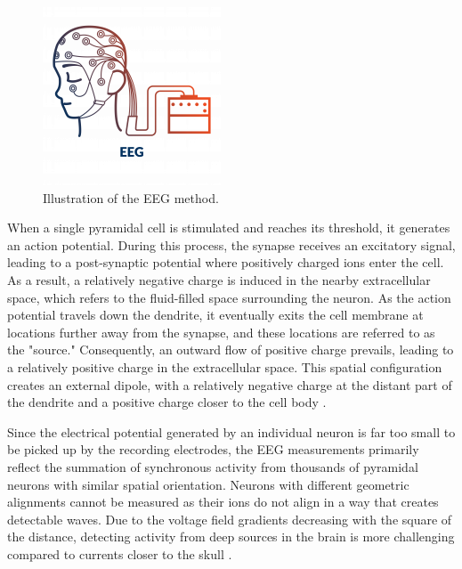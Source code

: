 \documentclass[a4paper, UKenglish, 11pt]{uiomaster}
\begin{document}
\begin{figure}[!htb]
    \centering
    \includegraphics[width=0.6\linewidth]{figures/EEG.png}
    \caption{Illustration of the EEG method.}
    \label{fig:EEG}
\end{figure}


When a single pyramidal cell is stimulated and reaches its threshold, it generates an action potential. During this process, the synapse receives an excitatory signal, leading to a post-synaptic potential where positively charged ions enter the cell. As a result, a relatively negative charge is induced in the nearby extracellular space, which refers to the fluid-filled space surrounding the neuron. As the action potential travels down the dendrite, it eventually exits the cell membrane at locations further away from the synapse, and these locations are referred to as the "source." Consequently, an outward flow of positive charge prevails, leading to a relatively positive charge in the extracellular space. This spatial configuration creates an external dipole, with a relatively negative charge at the distant part of the dendrite and a positive charge closer to the cell body \cite{bromfield2006introduction}.

Since the electrical potential generated by an individual neuron is far too small to be picked up by the recording electrodes, the EEG measurements primarily reflect the summation of synchronous activity from thousands of pyramidal neurons with similar spatial orientation. Neurons with different geometric alignments cannot be measured as their ions do not align in a way that creates detectable waves. Due to the voltage field gradients decreasing with the square of the distance, detecting activity from deep sources in the brain is more challenging compared to currents closer to the skull \cite{bromfield2006introduction}.
\end{document}

